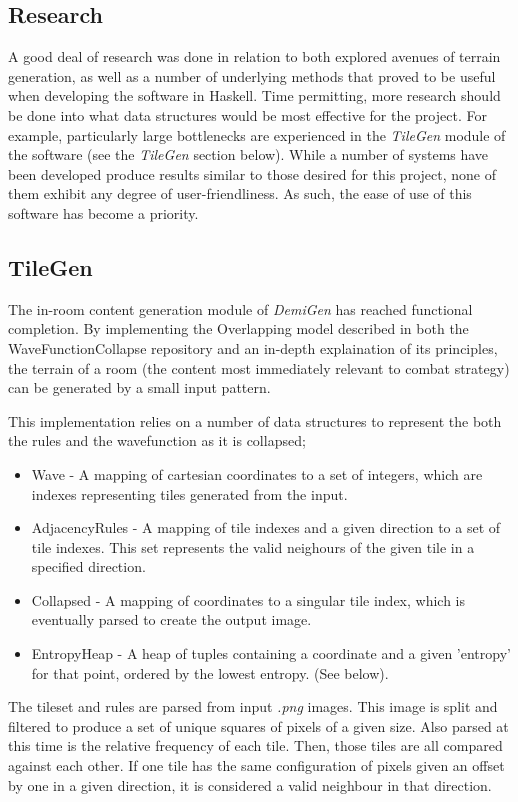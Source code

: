 \documentclass{article}
\begin{document}
\subsection{Research}
A good deal of research was done in relation to both explored avenues of terrain generation, as well as a number of underlying methods that proved to be useful when developing the software in Haskell. Time permitting, more research should be done into what data structures would be most effective for the project. For example, particularly large bottlenecks are experienced in the \textit{TileGen} module of the software (see the \textit{TileGen} section below). While a number of systems have been developed produce results similar to those desired for this project, none of them exhibit any degree of user-friendliness. As such, the ease of use of this software has become a priority.

\subsection{TileGen}
The in-room content generation module of \textit{DemiGen} has reached functional completion. By implementing the Overlapping model described in both the WaveFunctionCollapse\cite{wfc-report} repository and an in-depth explaination of its principles\cite{wfc-article}, the terrain of a room (the content most immediately relevant to combat strategy) can be generated by a small input pattern.




This implementation relies on a number of data structures to represent the both the rules and the wavefunction as it is collapsed;
\begin{itemize}
    \item Wave - A mapping of cartesian coordinates to a set of integers, which are indexes representing tiles generated from the input.
    \item AdjacencyRules - A mapping of tile indexes and a given direction to a set of tile indexes. This set represents the valid neighours of the given tile in a specified direction.
    \item Collapsed - A mapping of coordinates to a singular tile index, which is eventually parsed to create the output image.
    \item EntropyHeap - A heap of tuples containing a coordinate and a given 'entropy' for that point, ordered by the lowest entropy. (See below).
\end{itemize}
The tileset and rules are parsed from input \textit{.png} images. This image is split and filtered to produce a set of unique squares of pixels of a given size. Also parsed at this time is the relative frequency of each tile. Then, those tiles are all compared against each other. If one tile has the same configuration of pixels given an offset by one in a given direction, it is considered a valid neighbour in that direction.
\end{document}
